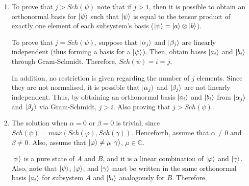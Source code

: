 \begin{enumerate}
\begin{comment}
    This means that $nullity(matrix) = 1$.
    Then, by the rank-nullity theorem, $rank(matrix) = n - 1$,
    which contradicts the fact that the columnspace of
    $\left[ \begin{matrix}
            \ket{i_A} \cdots \ket{j_A} \cdots \ket{n_A}
    \end{matrix} \right]$ spans $\mathbb{C}^n$.
    Therefore, the assumption that the rowspan of $\rho^A$ is linearly dependent
    for non-zero values of $\lambda_i$ must be false, and its rank equals $n$.
    

    In conclusion, if $\lambda_i \neq 0\ \forall i$, then $rank(\rho^A) = Sch(\rho^A)$.
    Note that if $\exists i, lambda_i = 0$, then the $rank$ will be diminished by
    one for each $\lambda_i = 0$.
\end{comment}
    
    \dotfill

    \item To prove that $j > Sch(\psi)$ note that if $j > 1$,
    then it is possible to obtain an orthonormal basis for $\ket{\psi}$
    such that $\ket{\psi}$ is equal to the tensor product of
    exactly one element of each subsystem's basis
    ($\ket{\psi} = \ket{a} \otimes \ket{b}$).
    
    To prove that $j = Sch(\psi)$, suppose that $\ket{\alpha_j}$ and $\ket{\beta_j}$
    are linearly independent (thus forming a basis for a $\ket{\psi}$).
    Then, obtain bases $\ket{a_i}$ and $\ket{b_i}$ through Gram-Schmidt.
    Therefore, $Sch(\psi) = i = j$.
    
    In addition, no restriction is given regarding the number of $j$ elements.
    Since they are not normalised, it is possible that
    $\ket{\alpha_j}$ and $\ket{\beta_j}$ are not linearly independent.
    Thus, by obtaining an orthonormal basis $\ket{a_i}$ and $\ket{b_i}$ from
    $\ket{\alpha_j}$ and $\ket{\beta_j}$ via Gram-Schmidt, $j > i$.
    Also proving that $j > Sch(\psi)$.
    
    \dotfill
    
    \item The solution when $\alpha = 0$ or $\beta = 0$ is trivial,
    since $Sch(\psi) = max(Sch(\varphi), Sch(\gamma))$.
    Henceforth, assume that $\alpha \neq 0$ and $\beta \neq 0$.
    Also, assume that $\ket{\varphi} \neq \mu \ket{\gamma}$,
    $\mu \in \mathbb{C}$.
    
    $\ket{\psi}$ is a pure state of $A$ and $B$,
    and it is a linear combination of $\ket{\varphi}$ and $\ket{\gamma}$.
    Also, note that $\ket{\psi}$, $\ket{\varphi}$, and $\ket{\gamma}$
    must be written in the same orthonormal basis
    $\ket{a_i}$ for subsystem $A$ and $\ket{b_i}$ analogously for $B$.
    Therefore,
    

\end{enumerate}
